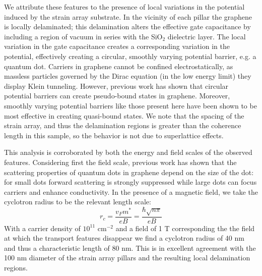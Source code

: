 \documentclass[edeposit,fullpage,draftthesis]{uiucthesis2009}
\begin{document}
            We attribute these features to the presence of local variations in the potential induced by the strain array substrate.
            In the vicinity of each pillar the graphene is locally delaminated; this delamination alters the 
            effective gate capacitance by including a region of vacuum in series with the SiO$_2$ dielectric layer.
            The local variation in the gate capacitance creates a corresponding variation in the potential,
            effectively creating a circular, smoothly varying potential barrier, e.g. a quantum dot.
            Carriers in graphene cannot be confined electrostatically, as massless particles governed by the Dirac equation
            (in the low energy limit)
            they display Klein tunneling\cite{katsnelson2006chiral,young2009quantum}.
            However, previous work has shown that circular potential barriers can create pseudo-bound states in 
            graphene\cite{silvestrov2007quantum,matulis2008quasibound,hewageegana2008electron,chen2007fock, heinisch2013mie}.
            Moreover, smoothly varying potential barriers like those present here have been shown to be most effective
            in creating quasi-bound states\cite{chen2007fock}.
            We note that the spacing of the strain array, and thus the delamination regions is greater than the coherence length
            in this sample, so the behavior is not due to superlattice effects.
            
            This analysis is corroborated by both the energy and field scales of the observed features. 
            Considering first the field scale,
            previous work\cite{heinisch2013mie} has shown that the scattering properties of
            quantum dots in graphene depend on the size of the dot:
            for small dots forward scattering is strongly suppressed while large dots can focus
            carriers and enhance conductivity.
            In the presence of a magnetic field, we take the cyclotron radius to be the relevant length scale:
            \begin{equation}
                r_c = \frac{v_F m^*}{e B} = \frac{\hbar \sqrt{n \pi}}{e B}
            \end{equation}
            With a carrier density of $10^{11}$ cm$^{-2}$ and a field of 1 T corresponding the the field 
            at which the transport features disappear 
            we find a cyclotron radius of 40 nm and thus a characteristic length of 80 nm.
            This is in excellent agreement with the 100 nm diameter of the strain array pillars
            and the resulting local delamination regions.
            
\end{document}
